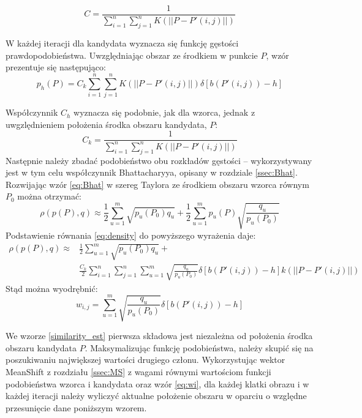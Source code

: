 \begin{equation}
C=\frac{1}{\sum_{i=1}^{n}\sum_{j=1}^{n}K(||P-P'(i,j)||)} 
\end{equation}

W każdej iteracji dla kandydata wyznacza się funkcję gęstości prawdopodobieństwa. 
Uwzględniając obszar ze środkiem w punkcie $P$, wzór prezentuje się następująco:
\begin{equation}
\label{eq:density}
p_h(P)=C_k\sum_{i=1}^{n}\sum_{j=1}^{n}K(||P-P'(i,j)||)\delta[b(P'(i,j))-h] 
\end{equation}

Współczynnik $C_h$ wyznacza się podobnie, jak dla wzorca, jednak z uwgzlędnieniem położenia środka obszaru kandydata, $P$:
\begin{equation}
C_k=\frac{1}{\sum_{i=1}^{n}\sum_{j=1}^{n}K(||P-P'(i,j)||)} 
\end{equation}
Następnie należy zbadać podobieństwo obu rozkładów gęstości -- wykorzystywany jest w tym celu współczynnik Bhattacharyya, opisany w rozdziale \ref{ssec:Bhat}. Rozwijając wzór \eqref{eq:Bhat} w szereg Taylora ze środkiem obszaru wzorca równym $P_0$ można otrzymać:
\begin{equation}
\label{eq:approx}
\rho(p(P),q)\approx\frac{1}{2}\sum_{u=1}^{m}\sqrt{p_u(P_0)q_u} + \frac{1}{2}\sum_{u=1}^{m}p_u(P)\sqrt{\frac{q_u}{p_u(P_0)}}
\end{equation}
Podstawienie równania \eqref{eq:density} do powyższego wyrażenia daje:
\begin{equation}
\label{similarity_est}
\begin{aligned}
\rho(p(P),q)\approx & \frac{1}{2}\sum_{u=1}^{m}\sqrt{p_u(P_0)q_u} + \\ & \frac{C_k}{2}\sum_{i=1}^{n}\sum_{j=1}^{n}\sum_{u=1}^{m}\sqrt{\frac{q_u}{p_u(P_0)}}\delta[b(P'(i,j))-h] k(||P-P'(i,j)||)
\end{aligned}
\end{equation}
Stąd można wyodrębnić:
\begin{equation}
\label{eq:wi}
w_{i,j}=\sum_{u=1}^{m}\sqrt{\frac{q_u}{p_u(P_0)}}\delta[b(P'(i,j))-h]
\end{equation}


We wzorze \eqref{similarity_est} pierwsza składowa jest niezależna od położenia środka obszaru kandydata $P$. 
Maksymalizując funkcję podobieństwa, należy skupić się na poszukiwaniu największej wartości drugiego członu. 
Wykorzystując wektor MeanShift z rozdziału \ref{ssec:MS} z wagami równymi wartościom funkcji podobieństwa wzorca i kandydata oraz wzór \eqref{eq:wi}, dla każdej klatki obrazu i w każdej iteracji należy wyliczyć aktualne położenie obszaru w oparciu o względne przesunięcie dane poniższym wzorem.


